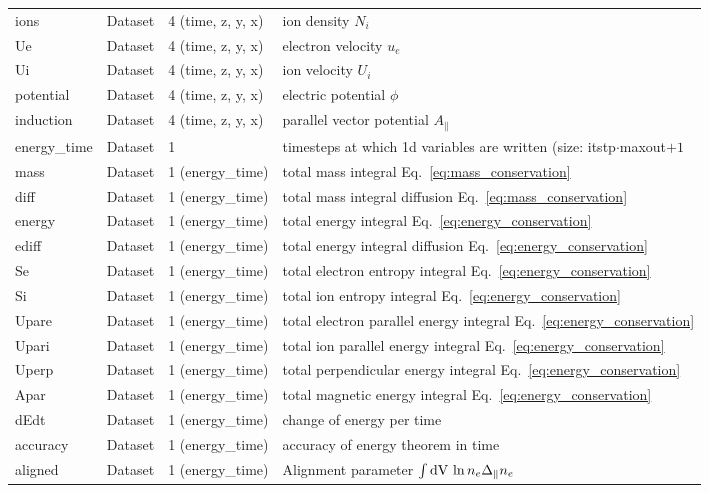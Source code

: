\begin{longtable}{lll>{\RaggedRight}p{7cm}}
ions             & Dataset & 4 (time, z, y, x) & ion density $N_i$ \\
Ue               & Dataset & 4 (time, z, y, x) & electron velocity $u_e$ \\
Ui               & Dataset & 4 (time, z, y, x) & ion velocity $U_i$ \\
potential        & Dataset & 4 (time, z, y, x) & electric potential $\phi$ \\
induction        & Dataset & 4 (time, z, y, x) & parallel vector potential $A_\parallel$ \\
energy\_time     & Dataset & 1 & timesteps at which 1d variables are written (size: itstp$\cdot$maxout$+1$ \\
mass      & Dataset & 1 (energy\_time) & total mass integral Eq.~\eqref{eq:mass_conservation} \\
diff      & Dataset & 1 (energy\_time) & total mass integral diffusion Eq.~\eqref{eq:mass_conservation} \\
energy    & Dataset & 1 (energy\_time) & total energy integral Eq.~\eqref{eq:energy_conservation} \\
ediff     & Dataset & 1 (energy\_time) & total energy integral diffusion Eq.~\eqref{eq:energy_conservation} \\
Se        & Dataset & 1 (energy\_time) & total electron entropy integral Eq.~\eqref{eq:energy_conservation} \\
Si        & Dataset & 1 (energy\_time) & total ion entropy integral Eq.~\eqref{eq:energy_conservation} \\
Upare        & Dataset & 1 (energy\_time) & total electron parallel energy integral Eq.~\eqref{eq:energy_conservation} \\
Upari        & Dataset & 1 (energy\_time) & total ion parallel energy integral Eq.~\eqref{eq:energy_conservation} \\
Uperp     & Dataset & 1 (energy\_time) & total perpendicular energy integral Eq.~\eqref{eq:energy_conservation} \\
Apar     & Dataset & 1 (energy\_time) & total magnetic energy integral Eq.~\eqref{eq:energy_conservation} \\
dEdt      & Dataset & 1 (energy\_time) & change of energy per time  \\
accuracy  & Dataset & 1 (energy\_time) & accuracy of energy theorem in time  \\
aligned   & Dataset & 1 (energy\_time) & Alignment parameter $\int\mathrm{dV}\, \ln n_e\Delta_\parallel n_e$\\
\bottomrule
\end{longtable}

